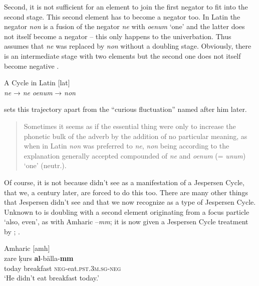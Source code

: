 ﻿\documentclass[output=paper]{langsci/langscibook}
\begin{document}
Second, it is not sufficient for an element to join the first negator to
fit into the second stage. This second element has to become a negator
too. In Latin the negator \textit{non} is a fusion of the negator
\textit{ne} with \textit{oenum} `one' and the latter does not itself
become a negator -- this only happens to the univerbation. Thus
\textcite[14--15]{Jespersen1917} assumes that \textit{ne} was replaced by
\textit{non} without a doubling stage. Obviously, there is an
intermediate stage with two elements but the second one does not itself
become negative .
%
\begin{exe}\ex\label{ex:int-a-cycle-in-latin}
          A Cycle in Latin [lat]\\[1ex]
\textit{ne} \hspace{5mm}  →  \hspace{5mm}  \textit{ne oenum}  \hspace{5mm}  →  \hspace{5mm}  \textit{non}
    \end{exe}
%
\textcite[14--15]{Jespersen1917} sets this trajectory apart from the ``curious fluctuation'' named after him later. 
%
\begin{quote}
Sometimes it seems as if the essential thing were only to increase the phonetic bulk of the adverb by the addition of no particular meaning, as when in Latin \textit{non} was preferred to \textit{ne}, \textit{non} being according to the explanation generally accepted compounded of \textit{ne} and \textit{oenum} (= \textit{unum}) `one' (neutr.).
\end{quote}
%
Of course, it is not because \textcite[14--15]{Jespersen1917} didn't see
 as a manifestation of a Jespersen Cycle, that we, a century
later, are forced to do this too. There are many other things that
Jespersen didn't see and that we now recognize as a type of Jespersen
Cycle. Unknown to \textcite{Jespersen1917} is doubling with a second element
originating from a focus particle `also, even', as with Amharic
–\textit{mm}; it is now given a Jespersen Cycle treatment by
\textcite[305--306, 349--350]{Sjors2015};
\textcite[341--343, 388--389]{Sjors2018}
 \parencite[cp. also][69 on the Loyalty Islands languages Drehu
and Nengone]{MoyseFaurieOzanneRivierre1999}.
%
\begin{exe}\ex\label{ex:int-amharic-breakfast}
Amharic [amh] \\
    \gll zare  ḳurs    \textbf{al}-bälla-\textbf{mm} \\
  today  breakfast  \textsc{neg}-eat.\textsc{pst.3m.sg-neg}  \\
    \glt `He didn't eat breakfast today.'
    \end{exe}
\end{document}
